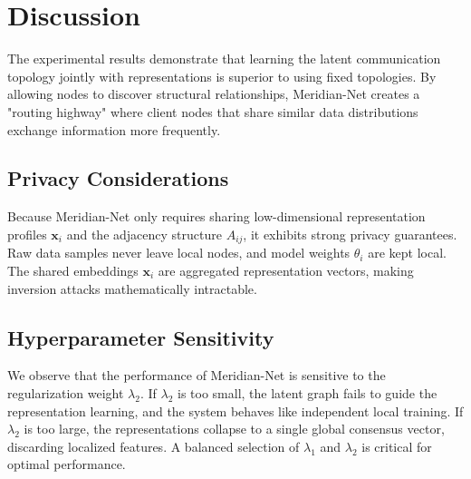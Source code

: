 \section{Discussion}
The experimental results demonstrate that learning the latent communication topology jointly with representations is superior to using fixed topologies. By allowing nodes to discover structural relationships, Meridian-Net creates a "routing highway" where client nodes that share similar data distributions exchange information more frequently.

\subsection{Privacy Considerations}
Because Meridian-Net only requires sharing low-dimensional representation profiles $\mathbf{x}_i$ and the adjacency structure $A_{ij}$, it exhibits strong privacy guarantees. Raw data samples never leave local nodes, and model weights $\theta_i$ are kept local. The shared embeddings $\mathbf{x}_i$ are aggregated representation vectors, making inversion attacks mathematically intractable.

\subsection{Hyperparameter Sensitivity}
We observe that the performance of Meridian-Net is sensitive to the regularization weight $\lambda_2$. If $\lambda_2$ is too small, the latent graph fails to guide the representation learning, and the system behaves like independent local training. If $\lambda_2$ is too large, the representations collapse to a single global consensus vector, discarding localized features. A balanced selection of $\lambda_1$ and $\lambda_2$ is critical for optimal performance.
